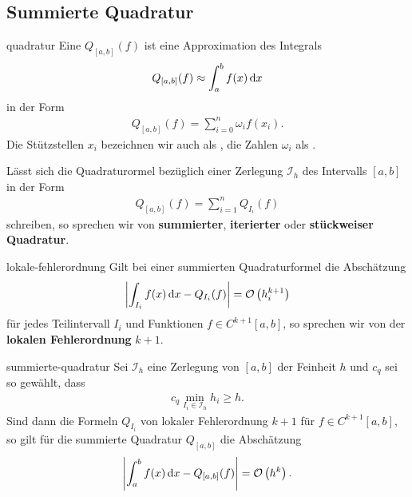 \subsection{Summierte Quadratur}

\begin{Definition}{quadratur}
  Eine  $Q_{[a,b]}(f)$ ist eine Approximation
  des Integrals
  \begin{gather}
    Q_{[a,b]}(f) \approx \int_a^b f(x)\,\mathrm{d} x
  \end{gather}
  in der Form
  \begin{gather}
    Q_{[a,b]}(f) = \sum_{i=0}^n \omega_i f(x_i).
  \end{gather}
  Die Stützstellen $x_i$ bezeichnen wir auch als
  , die Zahlen $\omega_i$ als
  .

  Lässt sich die Quadraturormel bezüglich einer Zerlegung
  $\mathcal I_h$ des Intervalls $[a,b]$ in der Form
  \begin{gather}
    Q_{[a,b]}(f) = \sum_{i=1}^n Q_{I_i} (f)
  \end{gather}
  schreiben, so sprechen wir von \textbf{summierter},
  \textbf{iterierter} oder \textbf{stückweiser Quadratur}.
\end{Definition}

\begin{Definition}{lokale-fehlerordnung}
  Gilt bei einer summierten Quadraturformel die Abschätzung
  \begin{gather}
    \left|\int_{I_i} f(x)\,\mathrm{d} x - Q_{I_i}(f)\right|
    =\mathcal O\left(h_i^{k+1}\right)
  \end{gather}
  für jedes Teilintervall $I_i$ und Funktionen $f\in C^{k+1}[a,b]$, so
  sprechen wir von der \textbf{lokalen
    Fehlerordnung} $k+1$.
\end{Definition}

\begin{Satz}{summierte-quadratur}
  Sei $\mathcal I_h$ eine Zerlegung von $[a,b]$ der Feinheit $h$ und
  $c_q$ sei so gewählt, dass
  \begin{gather}
    c_q \min_{I_i\in \mathcal I_h} h_i \ge h.
  \end{gather}
  Sind dann die Formeln $Q_{I_i}$ von lokaler Fehlerordnung $k+1$ für
  $f\in C^{k+1}[a,b]$, so gilt für die summierte Quadratur $Q_{[a,b]}$
  die Abschätzung
  \begin{gather}
    \left|\int_a^b f(x)\,\mathrm{d} x - Q_{[a,b]}(f)\right|
    = \mathcal O\left(h^{k}\right).
  \end{gather}
\end{Satz}

